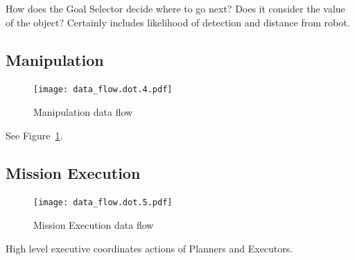 \documentclass[12pt]{article}
\begin{document}
How does the Goal Selector decide where to go next? Does it consider the value of the object? Certainly includes likelihood of detection and distance from robot.

\subsection{Manipulation}\label{Manipulation}
\begin{figure}
\centering
\texttt{[image: data\_flow.dot.4.pdf]}
\caption{Manipulation data flow}
\label{fig_df_man}
\end{figure}
See Figure~\ref{fig_df_man}.

\subsection{Mission Execution}\label{MissionExecution}
\begin{figure}
\centering
\texttt{[image: data\_flow.dot.5.pdf]}
\caption{Mission Execution data flow}
\label{fig_df_exec}
\end{figure}

High level executive coordinates actions of Planners and Executors.



\end{document}
